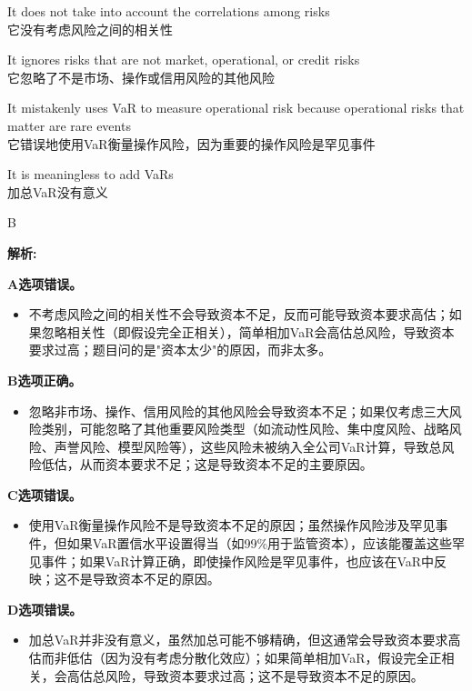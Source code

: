 \documentclass{article}
\newenvironment{explanation}
{\textbf{解析:}\par}
{\par}
\begin{document}
\begin{choices}
    \item It does not take into account the correlations among risks\\
    它没有考虑风险之间的相关性
    \item It ignores risks that are not market, operational, or credit risks\\
    它忽略了不是市场、操作或信用风险的其他风险
    \item It mistakenly uses VaR to measure operational risk because operational risks that matter are rare events\\
    它错误地使用VaR衡量操作风险，因为重要的操作风险是罕见事件
    \item It is meaningless to add VaRs\\
    加总VaR没有意义
\end{choices}

\begin{correctanswer}
    B
\end{correctanswer}

\begin{explanation}
    \textbf{A选项错误。}
    \begin{itemize}
        \item 不考虑风险之间的相关性不会导致资本不足，反而可能导致资本要求高估；如果忽略相关性（即假设完全正相关），简单相加VaR会高估总风险，导致资本要求过高；题目问的是"资本太少"的原因，而非太多。
    \end{itemize}

    \textbf{B选项正确。}
    \begin{itemize}
        \item 忽略非市场、操作、信用风险的其他风险会导致资本不足；如果仅考虑三大风险类别，可能忽略了其他重要风险类型（如流动性风险、集中度风险、战略风险、声誉风险、模型风险等），这些风险未被纳入全公司VaR计算，导致总风险低估，从而资本要求不足；这是导致资本不足的主要原因。
    \end{itemize}

    \textbf{C选项错误。}
    \begin{itemize}
        \item 使用VaR衡量操作风险不是导致资本不足的原因；虽然操作风险涉及罕见事件，但如果VaR置信水平设置得当（如99\%用于监管资本），应该能覆盖这些罕见事件；如果VaR计算正确，即使操作风险是罕见事件，也应该在VaR中反映；这不是导致资本不足的原因。
    \end{itemize}

    \textbf{D选项错误。}
    \begin{itemize}
        \item 加总VaR并非没有意义，虽然加总可能不够精确，但这通常会导致资本要求高估而非低估（因为没有考虑分散化效应）；如果简单相加VaR，假设完全正相关，会高估总风险，导致资本要求过高；这不是导致资本不足的原因。
    \end{itemize}
\end{explanation}
\end{document}
